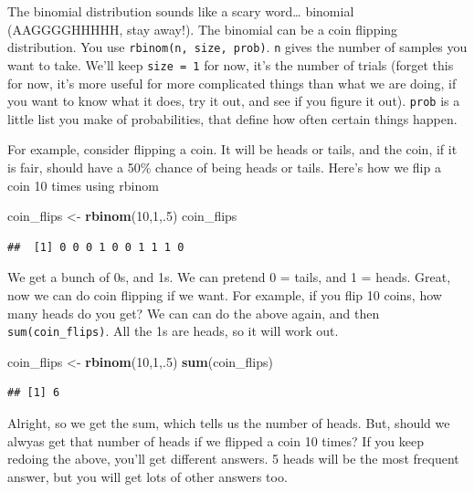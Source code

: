 \documentclass[]{book}
\newenvironment{Shaded}{\begin{snugshade}}{\end{snugshade}}
\newcommand{\KeywordTok}[1]{\textcolor[rgb]{0.13,0.29,0.53}{\textbf{{#1}}}}
\newcommand{\DecValTok}[1]{\textcolor[rgb]{0.00,0.00,0.81}{{#1}}}
\newcommand{\StringTok}[1]{\textcolor[rgb]{0.31,0.60,0.02}{{#1}}}
\newcommand{\NormalTok}[1]{{#1}}
\theoremstyle{definition}
\theoremstyle{definition}
\theoremstyle{definition}
\theoremstyle{remark}
\begin{document}
The binomial distribution sounds like a scary word\ldots{} binomial
(AAGGGGHHHHH, stay away!). The binomial can be a coin flipping
distribution. You use \texttt{rbinom(n,\ size,\ prob)}. \texttt{n} gives
the number of samples you want to take. We'll keep \texttt{size\ =\ 1}
for now, it's the number of trials (forget this for now, it's more
useful for more complicated things than what we are doing, if you want
to know what it does, try it out, and see if you figure it out).
\texttt{prob} is a little list you make of probabilities, that define
how often certain things happen.

For example, consider flipping a coin. It will be heads or tails, and
the coin, if it is fair, should have a 50\% chance of being heads or
tails. Here's how we flip a coin 10 times using rbinom

\begin{Shaded}
\begin{Highlighting}[]
\NormalTok{coin_flips <-}\StringTok{ }\KeywordTok{rbinom}\NormalTok{(}\DecValTok{10}\NormalTok{,}\DecValTok{1}\NormalTok{,.}\DecValTok{5}\NormalTok{)}
\NormalTok{coin_flips}
\end{Highlighting}
\end{Shaded}

\begin{verbatim}
##  [1] 0 0 0 1 0 0 1 1 1 0
\end{verbatim}

We get a bunch of 0s, and 1s. We can pretend 0 = tails, and 1 = heads.
Great, now we can do coin flipping if we want. For example, if you flip
10 coins, how many heads do you get? We can can do the above again, and
then \texttt{sum(coin\_flips)}. All the 1s are heads, so it will work
out.

\begin{Shaded}
\begin{Highlighting}[]
\NormalTok{coin_flips <-}\StringTok{ }\KeywordTok{rbinom}\NormalTok{(}\DecValTok{10}\NormalTok{,}\DecValTok{1}\NormalTok{,.}\DecValTok{5}\NormalTok{)}
\KeywordTok{sum}\NormalTok{(coin_flips)}
\end{Highlighting}
\end{Shaded}

\begin{verbatim}
## [1] 6
\end{verbatim}

Alright, so we get the sum, which tells us the number of heads. But,
should we alwyas get that number of heads if we flipped a coin 10 times?
If you keep redoing the above, you'll get different answers. 5 heads
will be the most frequent answer, but you will get lots of other answers
too.
\end{document}
